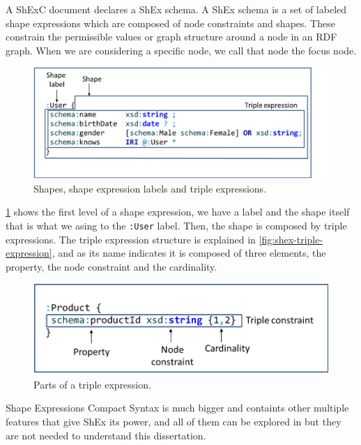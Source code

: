 A ShExC document declares a ShEx schema. A ShEx schema is a set of labeled shape expressions which are composed
of node constraints and shapes. These constrain the permissible values or graph structure around a node in an RDF
graph. When we are considering a specific node, we call that node the focus node.

\begin{figure}
  \includegraphics[scale=0.25]{images/shex-out.png}
  \centering
  \caption[Shapes, shape expression labels and triple expressions]{Shapes, shape expression labels and triple expressions.}
  \label{fig:shex-out-view}
\end{figure}

\cref{fig:shex-out-view} shows the first level of a shape expression, we have a label and the shape itself that is
what we asing to the \texttt{:User} label. Then, the shape is composed by triple expressions. The triple expression
structure is explained in \cref{fig:shex-triple-expression}, and as its name indicates it is composed of three
elements, the property, the node constraint and the cardinality.

\begin{figure}
  \includegraphics[scale=0.25]{images/shex-triple-expression.png}
  \centering
  \caption[Parts of a triple expression]{Parts of a triple expression.}
  \label{shex-triple-expression}
\end{figure}

Shape Expressions Compact Syntax is much bigger and containts other multiple features that give ShEx its power,
and all of them can be explored in \cite{labra-validating-rdf} but they are not needed to understand this
dissertation.

